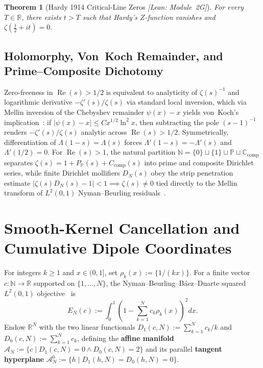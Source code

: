 \documentclass[11pt,a4paper]{article}
\newtheorem{theorem}{Theorem}[section]
\theoremstyle{definition}
\newcommand{\R}{\mathbb{R}}
\newcommand{\N}{\mathbb{N}}
\begin{document}
\begin{theorem}[Hardy 1914 Critical-Line Zeros \emph{[Lean: Module~2G]}]
For every $T \in \R$, there exists $t > T$ such that Hardy's $Z$-function vanishes and $\zeta(\tfrac{1}{2} + it) = 0$.
\end{theorem}

\subsection{Holomorphy, Von~Koch Remainder, and Prime--Composite Dichotomy}

Zero-freeness in $\operatorname{Re}(s) > 1/2$ is equivalent to analyticity of $\zeta(s)^{-1}$ and logarithmic derivative $-\zeta'(s)/\zeta(s)$ via standard local inversion, which via Mellin inversion of the Chebyshev remainder $\psi(x) - x$ yields von~Koch's implication~\cite{vonKoch1901}: if $|\psi(x) - x| \le C x^{1/2}\ln^2 x$, then subtracting the pole $(s-1)^{-1}$ renders $-\zeta'(s)/\zeta(s)$ analytic across $\operatorname{Re}(s) > 1/2$. Symmetrically, differentiation of $\Lambda(1-s) = \Lambda(s)$ forces $\Lambda'(1-s) = -\Lambda'(s)$ and $\Lambda'(1/2) = 0$. For $\operatorname{Re}(s) > 1$, the natural partition $\N = \{0\} \sqcup \{1\} \sqcup \mathbb{P} \sqcup \mathbb{C}_{\mathrm{comp}}$ separates $\zeta(s) = 1 + P_{\mathbb{P}}(s) + C_{\mathrm{comp}}(s)$ into prime and composite Dirichlet series, while finite Dirichlet mollifiers $D_N(s)$ obey the strip penetration estimate $|\zeta(s) D_N(s) - 1| < 1 \implies \zeta(s) \neq 0$ tied directly to the Mellin transform of $L^2(0,1)$ Nyman--Beurling residuals~\cite{BalazardSaiasYor1999}.

\section{Smooth-Kernel Cancellation and Cumulative Dipole Coordinates}\label{sec:vasyunin}

For integers $k \ge 1$ and $x \in (0,1]$, set $\rho_k(x) := \{1/(kx)\}$. For a finite vector $c : \N \to \R$ supported on $\{1, \dots, N\}$, the Nyman--Beurling--B\'aez--Duarte squared $L^2(0,1)$ objective~\cite{Nyman1950,Beurling1955,BaezDuarte2003,BaezDuarte2005} is
\begin{equation}\label{eq:nb_error}
E_N(c) := \int_0^1 \left(1 - \sum_{k=1}^N c_k \rho_k(x)\right)^2 dx.
\end{equation}
Endow $\R^N$ with the two linear functionals $D_1(c,N) := \sum_{k=1}^N c_k / k$ and $D_0(c,N) := \sum_{k=1}^N c_k$, defining the \textbf{affine manifold} $\mathcal{A}_N := \{c \mid D_1(c,N) = 0 \land D_0(c,N) = 2\}$ and its parallel \textbf{tangent hyperplane} $\mathcal{A}_N^0 := \{h \mid D_1(h,N) = D_0(h,N) = 0\}$.
\end{document}
